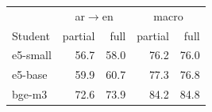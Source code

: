\begin{tabular}{@{}lrrrr@{}}
\toprule
 & \multicolumn{2}{c}{ar$\to$en} & \multicolumn{2}{c}{macro} \\
Student & partial & full & partial & full \\
\midrule
e5-small & 56.7 & 58.0 & 76.2 & 76.0 \\
e5-base & 59.9 & 60.7 & 77.3 & 76.8 \\
bge-m3 & 72.6 & 73.9 & 84.2 & 84.8 \\
\bottomrule
\end{tabular}
